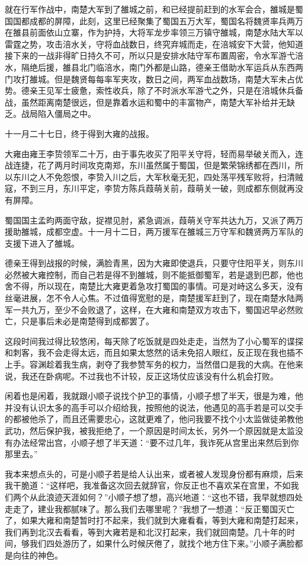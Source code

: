 就在行军作战中，南楚大军到了雒城之前，和已经提前赶到的水军会合，雒城是蜀国国都成都的屏障，此刻，这里已经聚集了蜀国五万大军，蜀国名将魏贤率兵两万在雒县前面依山立寨，作为护持，大将军龙步率领三万镇守雒城，南楚水陆大军以雷霆之势，攻击涪水关，守将血战数日，终究弃城而走，在涪城安下大营，他知道接下来的一战非得旷日持久不可，所以只是安排水陆守军布置周密，令水军游弋涪水，隔绝后援，雒县北门临涪水，南门外都是山路，德亲王借助水军运兵从东西两门攻打雒城。但是魏贤每每率军夹攻，数日之间，两军血战数场，南楚大军未占优势。德亲王见军士疲惫，索性收兵，除了不时派水军游弋之外，只是在涪城休兵备战，虽然距离南楚很远，但是靠着水运和蜀中的丰富物产，南楚大军补给并无缺乏。战局陷入僵局之中。

十一月二十七日，终于得到大雍的战报。

大雍由雍王李贽领军二十万，由于事先收买了阳平关守将，轻而易举破关而入，连战连捷，花了两月时间攻克南郑，东川虽然属于蜀国，但是繁荣锦绣都在西川，所以东川之人不免怨恨，李贽入川之后，大军秋毫无犯，四处荡平残军败将，扫清贼寇，不到三月，东川平定，李贽方陈兵葭萌关前，葭萌关一破，则成都东侧就再没有屏障。

蜀国国主孟昀两面守敌，捉襟见肘，紧急调派，葭萌关守军共达九万，又派了两万援助雒城，成都空虚。十一月十二日，两万援军在雒城三万守军和魏贤两万军队的支援下进入了雒城。

德亲王得到战报的时候，满脸青黑，因为大雍即使退兵，只要守住阳平关，则东川必然被大雍控制，而自己若是得不到雒城，则不能抵御蜀军，若是退到巴郡，他也舍不得，所以现在，南楚比大雍更着急攻打蜀国的事情。可是对峙这么多天，没有丝毫进展，怎不令人心焦。不过值得宽慰的是，南楚援军赶到了，现在南楚水陆两军一共九万，至少不会败退了，这样，在大雍和南楚双方攻击下，蜀国迟早必然败亡，只是事后未必是南楚得到成都罢了。

这段时间我过得比较悠闲，每天除了吃饭就是四处走走，当然为了小心蜀军的谍探和刺客，我不会走得太远，而且如果太悠然的话未免招人眼红，反正现在我也插不上手。容渊趁着我生病，剥夺了我参赞军务的权力，当然借口是我的大病。在他来说，我还在卧病呢。不过我也不计较，反正这场仗应该没有什么机会打败。

闲着也是闲着，我就跟小顺子说找个护卫的事情，小顺子想了半天，很是为难，他并没有认识太多的高手可以介绍给我，按照他的说法，他遇见的高手若是可以交手的都被他杀了，而且还需要忠心，这就更难了，他问我要不找个小太监做徒弟教他武功，然后保护我，被我拒绝了，一个原因是时间太长，另外一个原因就是太监没有办法经常出宫，小顺子想了半天道：“要不过几年，我诈死从宫里出来然后到你那里去。”

我本来想点头的，可是小顺子若是给人认出来，或者被人发现身份都有麻烦，后来我干脆道：“这样吧，我准备这次回去就辞官，你反正也不喜欢呆在宫里，不如我们两个从此浪迹天涯如何？”小顺子想了想，高兴地道：“这也不错，我早就想四处走走了，建业我都腻味了。那么我们去哪里呢？”我想了一想道：“反正蜀国灭亡了，如果大雍和南楚暂时打不起来，我们就到大雍看看，等到大雍和南楚打起来，我们再到北汉去看看，等到大雍若是和北汉打起来，我们就回南楚。几十年的时间，够我们四处游历了，如果什么时候厌倦了，就找个地方住下来。”小顺子满脸都是向往的神色。

